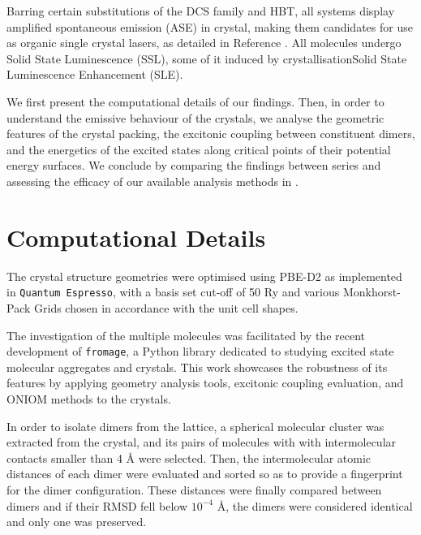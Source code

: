 
Barring certain substitutions of the DCS family and HBT, all systems display amplified spontaneous emission (ASE) in crystal, making them candidates for use as organic single crystal lasers, as detailed in Reference . All molecules undergo Solid State Luminescence (SSL),\cite{Shi2017} some of it induced by crystallisation\textemdash{}Solid State Luminescence Enhancement (SLE).



We first present the computational details of our findings. Then, in order to understand the emissive behaviour of the crystals, we analyse  the geometric features of the crystal packing, the excitonic coupling between constituent dimers, and the energetics of the excited states along critical points of their potential energy surfaces. We conclude by comparing the findings between series and assessing the efficacy of our available analysis methods in .


\section{Computational Details}
The crystal structure geometries were optimised using PBE-D2 as implemented in \texttt{Quantum Espresso}\cite{Giannozzi2009}, with a basis set cut-off of 50 Ry and various Monkhorst-Pack Grids chosen in accordance with the unit cell shapes.

The investigation of the multiple molecules was facilitated by the recent development of \texttt{fromage}, a Python library dedicated to studying excited state molecular aggregates and crystals. This work showcases the robustness of its features by applying geometry analysis tools, excitonic coupling evaluation, and ONIOM methods to the crystals.

In order to isolate dimers from the lattice, a spherical molecular cluster was extracted from the crystal, and its pairs of molecules with with intermolecular contacts smaller than 4 \AA{} were selected. Then, the intermolecular atomic distances of each dimer were evaluated and sorted so as to provide a fingerprint for the dimer configuration. These distances were finally compared between dimers and if their RMSD fell below $10^{-4}$ \AA, the dimers were considered identical and only one was preserved.

